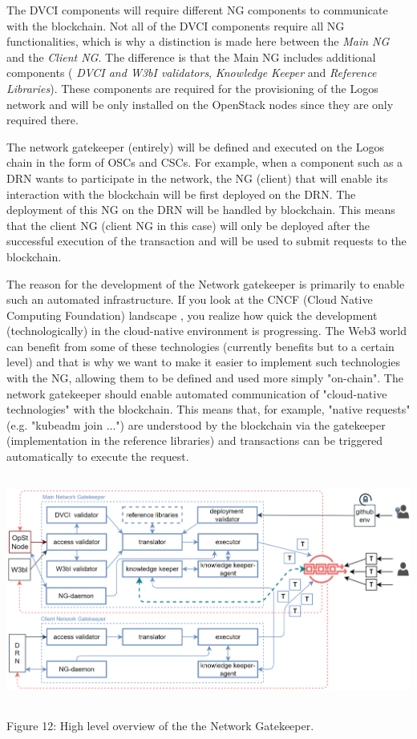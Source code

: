 \documentclass[]{article}
\begin{document}
The DVCI components will require different NG components to communicate with the blockchain.   
Not all of the DVCI components require all NG functionalities, which is why a distinction is made here between the \textit{Main NG} and the \textit{Client NG}.
The difference is that the Main NG includes additional components (\textit{ DVCI and W3bI validators}, \textit{Knowledge Keeper} and \textit{Reference Libraries}). 
These components are required for the provisioning of the Logos network and will be only installed on the OpenStack nodes since they are only required there.

The network gatekeeper (entirely) will be defined and executed on the Logos chain in the form of OSCs and CSCs.
For example, when a component such as a DRN wants to participate in the network, the NG (client) that will enable its interaction with the blockchain will be first deployed on the DRN. 
The deployment of this NG on the DRN will be handled by blockchain. 
This means that the client NG (client NG in this case) will only be deployed after the successful execution of the transaction and will be used to submit requests to the blockchain.

The reason for the development of the Network gatekeeper is primarily to enable such an automated infrastructure.
If you look at the CNCF (Cloud Native Computing Foundation) landscape \cite{cncf-land}, you realize how quick the development (technologically) in the cloud-native environment is progressing. 
The Web3 world can benefit from some of these technologies (currently benefits but to a certain level) and that is why we want to make it easier to implement such technologies with the NG, allowing them to be defined and used more simply "on-chain".
The network gatekeeper should enable automated communication of "cloud-native technologies" with the blockchain. 
This means that, for example, "native requests" (e.g. "kubeadm join ...") are understood by the blockchain via the gatekeeper (implementation in the reference libraries) and transactions can be triggered automatically to execute the request.

\begin{center}
	\includegraphics[height=7.5cm]{network-gatekeeper}
\end{center}
\begin{center}
	Figure 12: High level overview of the the Network Gatekeeper.
\end{center}
\end{document}
